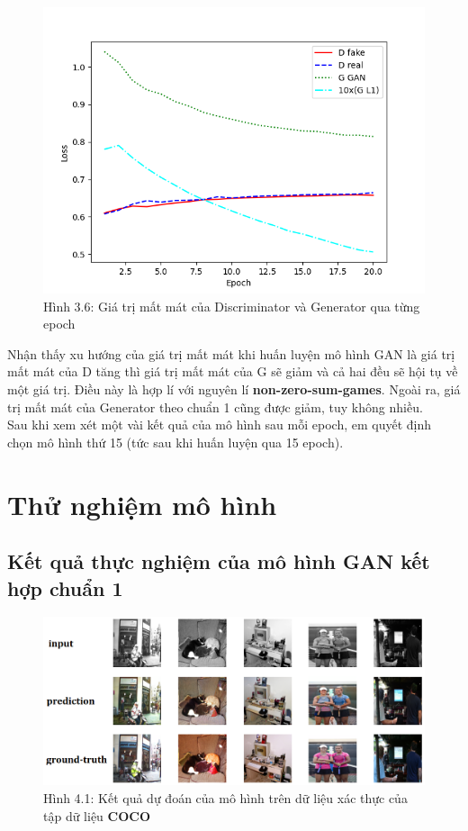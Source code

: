 \documentclass[a4paper]{article}
\begin{document}
\begin{figure}[h!]
\centering
\includegraphics[width=15cm]{images/3_6.png}
\caption{Hình 3.6: Giá trị mất mát của Discriminator và Generator qua từng epoch}
\end{figure}

\noindent
Nhận thấy xu hướng của giá trị mất mát khi huấn luyện mô hình GAN là giá trị mất mát của D tăng thì giá trị mất mát của G sẽ giảm và cả hai đều sẽ hội tụ về một giá trị. Điều này là hợp lí với nguyên lí \textbf{non-zero-sum-games}. Ngoài ra, giá trị mất mát của Generator theo chuẩn 1 cũng được giảm, tuy không nhiều.\\

\noindent
Sau khi xem xét một vài kết quả của mô hình sau mỗi epoch, em quyết định chọn mô hình thứ 15 (tức sau khi huấn luyện qua 15 epoch).

\section{Thử nghiệm mô hình}

\subsection{Kết quả thực nghiệm của mô hình GAN kết hợp chuẩn 1}\label{experiment}

\begin{figure}[h!]
\centering
\includegraphics[width=14.4cm]{images/4_1.png}
\caption{Hình 4.1: Kết quả dự đoán của mô hình trên dữ liệu xác thực của tập dữ liệu \textbf{COCO}}
\end{figure}
\end{document}
